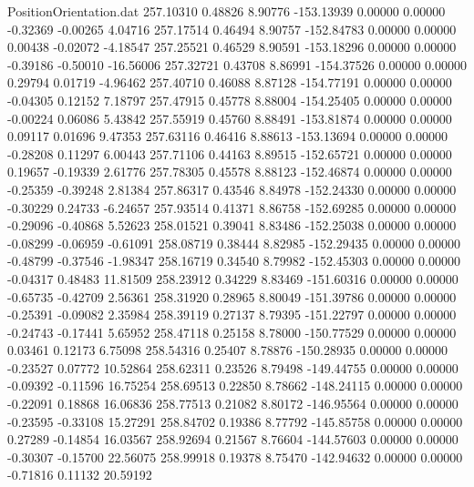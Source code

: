 \begin{filecontents}{PositionOrientation.dat}
 257.10310    0.48826    8.90776  -153.13939    0.00000    0.00000   -0.32369   -0.00265    4.04716
 257.17514    0.46494    8.90757  -152.84783    0.00000    0.00000    0.00438   -0.02072   -4.18547
 257.25521    0.46529    8.90591  -153.18296    0.00000    0.00000   -0.39186   -0.50010  -16.56006
 257.32721    0.43708    8.86991  -154.37526    0.00000    0.00000    0.29794    0.01719   -4.96462
 257.40710    0.46088    8.87128  -154.77191    0.00000    0.00000   -0.04305    0.12152    7.18797
 257.47915    0.45778    8.88004  -154.25405    0.00000    0.00000   -0.00224    0.06086    5.43842
 257.55919    0.45760    8.88491  -153.81874    0.00000    0.00000    0.09117    0.01696    9.47353
 257.63116    0.46416    8.88613  -153.13694    0.00000    0.00000   -0.28208    0.11297    6.00443
 257.71106    0.44163    8.89515  -152.65721    0.00000    0.00000    0.19657   -0.19339    2.61776
 257.78305    0.45578    8.88123  -152.46874    0.00000    0.00000   -0.25359   -0.39248    2.81384
 257.86317    0.43546    8.84978  -152.24330    0.00000    0.00000   -0.30229    0.24733   -6.24657
 257.93514    0.41371    8.86758  -152.69285    0.00000    0.00000   -0.29096   -0.40868    5.52623
 258.01521    0.39041    8.83486  -152.25038    0.00000    0.00000   -0.08299   -0.06959   -0.61091
 258.08719    0.38444    8.82985  -152.29435    0.00000    0.00000   -0.48799   -0.37546   -1.98347
 258.16719    0.34540    8.79982  -152.45303    0.00000    0.00000   -0.04317    0.48483   11.81509
 258.23912    0.34229    8.83469  -151.60316    0.00000    0.00000   -0.65735   -0.42709    2.56361
 258.31920    0.28965    8.80049  -151.39786    0.00000    0.00000   -0.25391   -0.09082    2.35984
 258.39119    0.27137    8.79395  -151.22797    0.00000    0.00000   -0.24743   -0.17441    5.65952
 258.47118    0.25158    8.78000  -150.77529    0.00000    0.00000    0.03461    0.12173    6.75098
 258.54316    0.25407    8.78876  -150.28935    0.00000    0.00000   -0.23527    0.07772   10.52864
 258.62311    0.23526    8.79498  -149.44755    0.00000    0.00000   -0.09392   -0.11596   16.75254
 258.69513    0.22850    8.78662  -148.24115    0.00000    0.00000   -0.22091    0.18868   16.06836
 258.77513    0.21082    8.80172  -146.95564    0.00000    0.00000   -0.23595   -0.33108   15.27291
 258.84702    0.19386    8.77792  -145.85758    0.00000    0.00000    0.27289   -0.14854   16.03567
 258.92694    0.21567    8.76604  -144.57603    0.00000    0.00000   -0.30307   -0.15700   22.56075
 258.99918    0.19378    8.75470  -142.94632    0.00000    0.00000   -0.71816    0.11132   20.59192

\end{filecontents}
